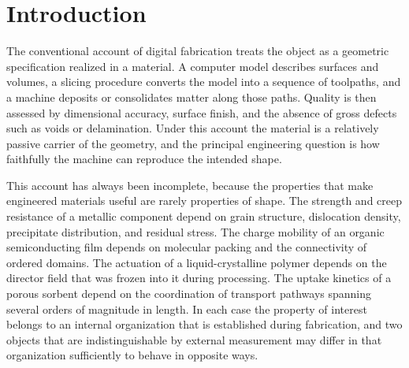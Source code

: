 \documentclass[11pt]{article}
\theoremstyle{definition}
\begin{document}
\tableofcontents
\newpage

\section{Introduction}

The conventional account of digital fabrication treats the object as a geometric specification realized in a material. A computer model describes surfaces and volumes, a slicing procedure converts the model into a sequence of toolpaths, and a machine deposits or consolidates matter along those paths. Quality is then assessed by dimensional accuracy, surface finish, and the absence of gross defects such as voids or delamination. Under this account the material is a relatively passive carrier of the geometry, and the principal engineering question is how faithfully the machine can reproduce the intended shape.

This account has always been incomplete, because the properties that make engineered materials useful are rarely properties of shape. The strength and creep resistance of a metallic component depend on grain structure, dislocation density, precipitate distribution, and residual stress. The charge mobility of an organic semiconducting film depends on molecular packing and the connectivity of ordered domains. The actuation of a liquid-crystalline polymer depends on the director field that was frozen into it during processing. The uptake kinetics of a porous sorbent depend on the coordination of transport pathways spanning several orders of magnitude in length. In each case the property of interest belongs to an internal organization that is established during fabrication, and two objects that are indistinguishable by external measurement may differ in that organization sufficiently to behave in opposite ways.
\end{document}
